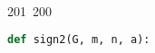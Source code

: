 201~200~\documentclass{article}
\begin{document}
	                                                                        	                                                                    	                                	                    	                    	                        	                        	                    	                                                                	                	                                                                    	                    							                                                                                                                                                            \begin{lstlisting}[language=Python, caption=Signature function Chall 2]
	                                                                        	                                                                    	                                	                    	                    	                        	                        	                    	                                                                	                	                                                                    	                    							                                                                                                                                                            def sign2(G, m, n, a):
	                                                                        	                                                                    	                                	                    	                    	                        	                        	                    	                                                                	                	                                                                    	                    							                                                                                                                                                                F = Integers(n)
	                                                                        	                                                                    	                                	                    	                    	                        	                        	                    	                                                                	                	                                                                    	                    							                                                                                                                                                                    key = hashlib.sha256(m).digest()

\end{lstlisting}
\end{document}
